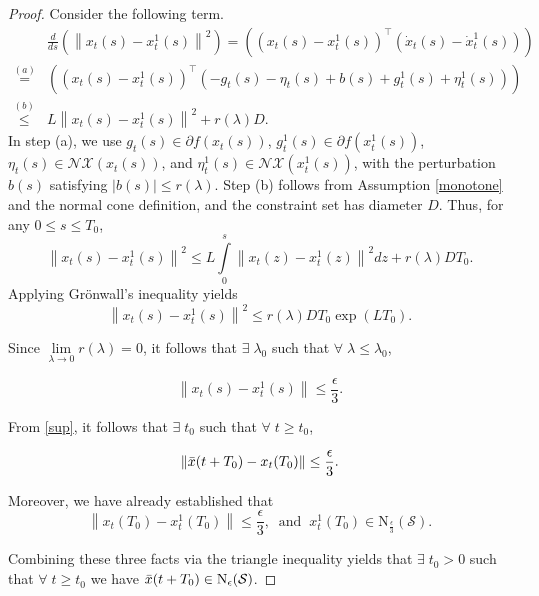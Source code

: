 \documentclass[9pt,journal,twoside,web]{ieeecolor}
\newcommand{\norm}[1]{\left\lVert #1 \right\rVert}
\begin{document}
\begin{proof}
Consider the following term.
\begin{equation*}
       \begin{split}
          &   \frac{d}{ds}(\norm{x_t(s)-x_t^1(s)}^2)
            =  ( (x_t(s)-x_t^1(s))^\top (\Dot{x}_t(s)-\Dot{x}_t^1(s))) 
           \\ \overset{(a)}= &  ( (x_t(s)-x_t^1(s))^\top (-g_t(s) - \eta_t(s) + b(s) + g_t^1(s) + \eta_t^1(s)))
           \\ \overset{(b)}\leq & L \norm{x_t(s)-x_t^1(s)}^2 + r(\lambda) D.
       \end{split}
       \label{10000}
   \end{equation*}
In step (a), we use $g_t(s) \in \partial f(x_t(s))$, $g_t^1(s) \in \partial f(x_t^1(s))$, $\eta_t(s) \in \mathcal{N}\mathcal{X}(x_t(s))$, and $\eta_t^1(s) \in \mathcal{N}\mathcal{X}(x_t^1(s))$, with the perturbation $b(s)$ satisfying $|b(s)| \leq r(\lambda)$. Step (b) follows from Assumption \ref{monotone} and the normal cone definition, and the constraint set has diameter $D$. Thus, for any $0 \leq s \leq T_0$,
    \begin{equation*}
        \norm{x_t(s)-x_t^1(s)}^2 \leq L \int\limits_{0}^{s}  \norm{x_t(z)-x_t^1(z)}^2 dz + r(\lambda) D T_0.
    \end{equation*}
Applying Grönwall’s inequality yields
\begin{equation*}
    \norm{x_t(s)-x_t^1(s)}^2 \leq r(\lambda) D T_0 \exp{ (L T_0)}.
\end{equation*}

Since $\lim\limits_{\lambda \to 0} r(\lambda) = 0$, it follows that  $\exists \; \lambda_0$ such that $\forall \; \lambda \leq \lambda_0$,  

\begin{equation*}
    \norm{x_t(s)-x_t^1(s)} \leq \frac{\epsilon}{3}.
\end{equation*}

From \eqref{sup}, it follows that $\exists \; t_0$ such that $\forall \; t \geq t_0$, 

\begin{equation*}
  \norm{  \Bar{x}(t+T_0) - x_t(T_0) } \leq \frac{\epsilon}{3}.
\end{equation*}

Moreover, we have already established that 
\begin{equation*}
    \norm{x_t(T_0) - x_t^1(T_0)} \leq \frac{\epsilon}{3}, \; \; \text{and} \; \;  x_t^1(T_0) \in \mathrm{N}_{\frac{\epsilon}{3}} (\mathcal{S}).
\end{equation*}

Combining these three facts via the triangle inequality yields that $\exists \; t_0>0$ such that $\forall \; t \geq t_0$ we have $\Bar{x}(t+T_0) \in \mathrm{N}_\epsilon (\mathcal{S})$.
\end{proof}
\end{document}
